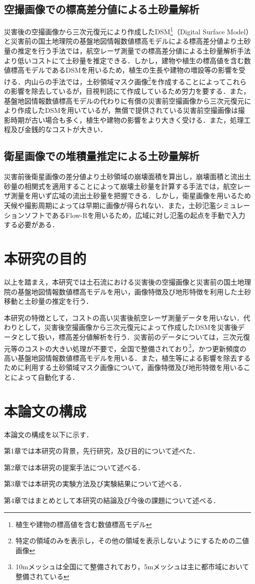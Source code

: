     \subsection*{空撮画像での標高差分値による土砂量解析}
      災害後の空撮画像から三次元復元により作成したDSM\footnote{植生や建物の標高値を含む数値標高モデル}（Digital Surface Model）と災害前の国土地理院の基盤地図情報数値標高モデル\cite{基盤地図情報}による標高差分値より土砂量の推定を行う手法\cite{土砂量解析3}では，航空レーザ測量での標高差分値による土砂量解析手法より低いコストにて土砂量を推定できる．しかし，建物や植生の標高値を含む数値標高モデルであるDSMを用いるため，植生の生長や建物の増設等の影響を受ける．内山らの手法\cite{土砂量解析4}では，土砂領域マスク画像\footnote{特定の領域のみを表示し，その他の領域を表示しないようにするための二値画像}を作成することによってこれらの影響を除去しているが，目視判読にて作成しているため労力を要する．また，基盤地図情報数値標高モデルの代わりに有償の災害前空撮画像から三次元復元により作成したDSMを用いているが，無償で提供されている災害前空撮画像は撮影時期が古い場合も多く，植生や建物の影響をより大きく受ける．また，処理工程及び金銭的なコストが大きい．


    \subsection*{衛星画像での堆積量推定による土砂量解析}
      災害前後衛星画像の差分値より土砂領域の崩壊面積を算出し，崩壊面積と流出土砂量の相関式を適用することによって崩壊土砂量を計算する手法\cite{土砂量解析5}では，航空レーザ測量を用いず広域の流出土砂量を把握できる．しかし，衛星画像を用いるため天候や撮影周期によっては早期に画像が得られない．また，土砂氾濫シミュレーションソフトであるFlow-R\cite{Flow-R}を用いるため，広域に対し氾濫の起点を手動で入力する必要がある．



  \section{本研究の目的}
    以上を踏まえ，本研究では土石流における災害後の空撮画像と災害前の国土地理院の基盤地図情報数値標高モデルを用い，画像特徴及び地形特徴を利用した土砂移動と土砂量の推定を行う．
    
    本研究の特徴として，コストの高い災害後航空レーザ測量データを用いない．代わりとして，災害後空撮画像から三次元復元によって作成したDSMを災害後データとして扱い，標高差分値解析を行う．災害前のデータについては，三次元復元等のコストの大きい処理が不要で，全国で整備されており\footnote{10mメッシュは全国にて整備されており，5mメッシュは主に都市域において整備されている}，かつ更新頻度の高い基盤地図情報数値標高モデルを用いる．また，植生等による影響を除去するために利用する土砂領域マスク画像について，画像特徴及び地形特徴を用いることによって自動化する．



  \section{本論文の構成}
    本論文の構成を以下に示す．
    
    第1章では本研究の背景，先行研究，及び目的について述べた．

    第2章では本研究の提案手法について述べる．

    第3章では本研究の実験方法及び実験結果について述べる．

    第4章ではまとめとして本研究の結論及び今後の課題について述べる．
